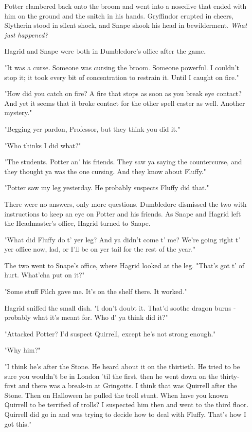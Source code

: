 \documentclass[a4paper,11pt]{article}
\begin{document}
Potter clambered back onto the broom and went into a nosedive that ended with him on the ground and the snitch in his hands. Gryffindor erupted in cheers, Slytherin stood in silent shock, and Snape shook his head in bewilderment. \emph{What just happened?}

Hagrid and Snape were both in Dumbledore's office after the game.

"It was a curse. Someone was cursing the broom. Someone powerful. I couldn't stop it; it took every bit of concentration to restrain it. Until I caught on fire."

"How did you catch on fire? A fire that stops as soon as you break eye contact? And yet it seems that it broke contact for the other spell caster as well. Another mystery."

"Begging yer pardon, Professor, but they think you did it."

"Who thinks I did what?"

"The students. Potter an' his friends. They saw ya saying the countercurse, and they thought ya was the one cursing. And they know about Fluffy."

"Potter saw my leg yesterday. He probably suspects Fluffy did that."

There were no answers, only more questions. Dumbledore dismissed the two with instructions to keep an eye on Potter and his friends. As Snape and Hagrid left the Headmaster's office, Hagrid turned to Snape.

"What did Fluffy do t' yer leg? And ya didn't come t' me? We're going right t' yer office now, lad, or I'll be on yer tail for the rest of the year."

The two went to Snape's office, where Hagrid looked at the leg. "That's got t' of hurt. What'cha put on it?"

"Some stuff Filch gave me. It's on the shelf there. It worked."

Hagrid sniffed the small dish. "I don't doubt it. That'd soothe dragon burns - probably what it's meant for. Who d' ya think did it?"

"Attacked Potter? I'd suspect Quirrell, except he's not strong enough."

"Why him?"

"I think he's after the Stone. He heard about it on the thirtieth. He tried to be sure you wouldn't be in London 'til the first, then he went down on the thirty-first and there was a break-in at Gringotts. I think that was Quirrell after the Stone. Then on Halloween he pulled the troll stunt. When have you known Quirrell to be terrified of trolls? I suspected him then and went to the third floor. Quirrell did go in and was trying to decide how to deal with Fluffy. That's how I got this."
\end{document}
